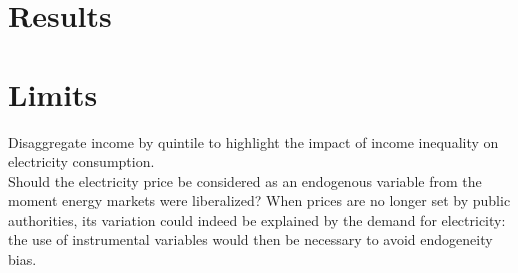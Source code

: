 \section{Results}

\section{Limits}
Disaggregate income by quintile to highlight the impact of income inequality on electricity consumption. \\

Should the electricity price be considered as an endogenous variable from the moment energy markets were liberalized? When prices are no longer set by public authorities, its variation could indeed be explained by the demand for electricity: the use of instrumental variables would then be necessary to avoid endogeneity bias.
